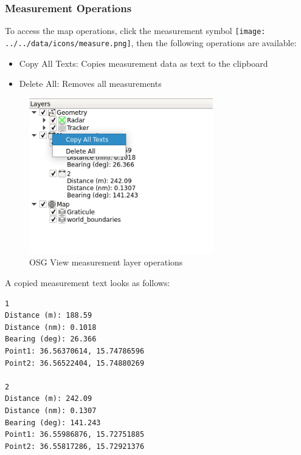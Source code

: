 \subsubsection{Measurement Operations}
\label{sec:osg_measure_ops}

To access the map operations, click the measurement symbol \texttt{[image: ../../data/icons/measure.png]}, then the following operations are available:

\begin{itemize}
 \item Copy All Texts: Copies measurement data as text to the clipboard
 \item Delete All: Removes all measurements
\end{itemize} 

\begin{figure}[H]
    \includegraphics[width=8cm,frame]{figures/osgview_measure_ops.png}
  \caption{OSG View measurement layer operations}
\end{figure}

A copied measurement text looks as follows:

\begin{lstlisting}
1
Distance (m): 188.59
Distance (nm): 0.1018
Bearing (deg): 26.366
Point1: 36.56370614, 15.74786596
Point2: 36.56522404, 15.74880269

2
Distance (m): 242.09
Distance (nm): 0.1307
Bearing (deg): 141.243
Point1: 36.55986876, 15.72751885
Point2: 36.55817286, 15.72921376
\end{lstlisting}
